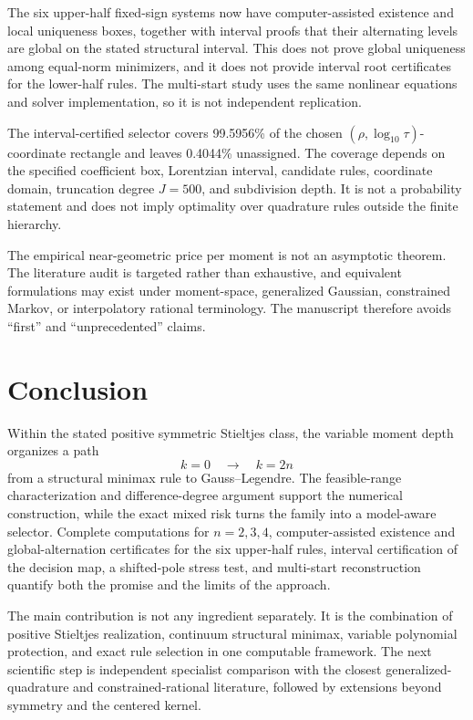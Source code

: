 \documentclass[preprint,12pt]{elsarticle}
\theoremstyle{remark}
\begin{document}
The six upper-half fixed-sign systems now have computer-assisted
existence and local uniqueness boxes, together with interval proofs that
their alternating levels are global on the stated structural interval.
This does not prove global uniqueness among equal-norm minimizers, and it
does not provide interval root certificates for the lower-half rules.
The multi-start study uses the same nonlinear equations and solver
implementation, so it is not independent replication.

The interval-certified selector covers 99.5956\% of the
chosen \((\rho,\log_{10}\tau)\)-coordinate rectangle and leaves
0.4044\% unassigned. The coverage depends on the
specified coefficient box, Lorentzian interval, candidate rules,
coordinate domain, truncation degree \(J=500\), and subdivision depth.
It is not a probability statement and does not imply optimality over
quadrature rules outside the finite hierarchy.

The empirical near-geometric price per moment is not an asymptotic
theorem. The literature audit is targeted rather than exhaustive, and
equivalent formulations may exist under moment-space, generalized
Gaussian, constrained Markov, or interpolatory rational terminology.
The manuscript therefore avoids ``first'' and ``unprecedented'' claims.

\section{Conclusion}

Within the stated positive symmetric Stieltjes class, the variable
moment depth organizes a path
\[
k=0
\quad\longrightarrow\quad
k=2n
\]
from a structural minimax rule to Gauss--Legendre. The
feasible-range characterization and difference-degree argument support
the numerical construction, while the exact mixed risk turns the family
into a model-aware selector. Complete computations for \(n=2,3,4\), computer-assisted existence
and global-alternation certificates for the six upper-half rules,
interval certification of the decision map, a shifted-pole stress test,
and multi-start reconstruction quantify both the promise and the limits
of the approach.

The main contribution is not any ingredient separately. It is the
combination of positive Stieltjes realization, continuum structural
minimax, variable polynomial protection, and exact rule selection in one
computable framework. The next scientific step is independent
specialist comparison with the closest generalized-quadrature and
constrained-rational literature, followed by extensions beyond symmetry
and the centered kernel.
\end{document}
